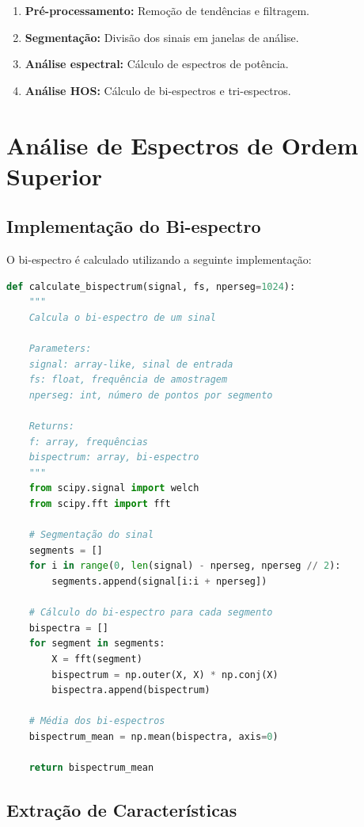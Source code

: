 \begin{enumerate}
    \item \textbf{Pré-processamento:} Remoção de tendências e filtragem.
    \item \textbf{Segmentação:} Divisão dos sinais em janelas de análise.
    \item \textbf{Análise espectral:} Cálculo de espectros de potência.
    \item \textbf{Análise HOS:} Cálculo de bi-espectros e tri-espectros.
\end{enumerate}

\section{Análise de Espectros de Ordem Superior}

\subsection{Implementação do Bi-espectro}

O bi-espectro é calculado utilizando a seguinte implementação:

\begin{lstlisting}[language=Python, caption=Cálculo do bi-espectro]
def calculate_bispectrum(signal, fs, nperseg=1024):
    """
    Calcula o bi-espectro de um sinal
    
    Parameters:
    signal: array-like, sinal de entrada
    fs: float, frequência de amostragem
    nperseg: int, número de pontos por segmento
    
    Returns:
    f: array, frequências
    bispectrum: array, bi-espectro
    """
    from scipy.signal import welch
    from scipy.fft import fft
    
    # Segmentação do sinal
    segments = []
    for i in range(0, len(signal) - nperseg, nperseg // 2):
        segments.append(signal[i:i + nperseg])
    
    # Cálculo do bi-espectro para cada segmento
    bispectra = []
    for segment in segments:
        X = fft(segment)
        bispectrum = np.outer(X, X) * np.conj(X)
        bispectra.append(bispectrum)
    
    # Média dos bi-espectros
    bispectrum_mean = np.mean(bispectra, axis=0)
    
    return bispectrum_mean
\end{lstlisting}

\subsection{Extração de Características}

